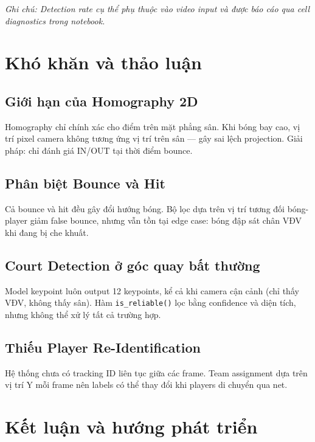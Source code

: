 \documentclass[12pt,a4paper]{article}
\begin{document}
\textit{Ghi chú: Detection rate cụ thể phụ thuộc vào video input và được báo cáo qua cell diagnostics trong notebook.}

\section{Khó khăn và thảo luận}
\label{sec:challenges}

\subsection{Giới hạn của Homography 2D}
Homography chỉ chính xác cho điểm trên mặt phẳng sân. Khi bóng bay cao, vị trí pixel camera không tương ứng vị trí trên sân --- gây sai lệch projection. Giải pháp: chỉ đánh giá IN/OUT tại thời điểm bounce.

\subsection{Phân biệt Bounce và Hit}
Cả bounce và hit đều gây đổi hướng bóng. Bộ lọc dựa trên vị trí tương đối bóng-player giảm false bounce, nhưng vẫn tồn tại edge case: bóng đập sát chân VĐV khi đang bị che khuất.

\subsection{Court Detection ở góc quay bất thường}
Model keypoint luôn output 12 keypoints, kể cả khi camera cận cảnh (chỉ thấy VĐV, không thấy sân). Hàm \texttt{is\_reliable()} lọc bằng confidence và diện tích, nhưng không thể xử lý tất cả trường hợp.

\subsection{Thiếu Player Re-Identification}
Hệ thống chưa có tracking ID liên tục giữa các frame. Team assignment dựa trên vị trí Y mỗi frame nên labels có thể thay đổi khi players di chuyển qua net.

\section{Kết luận và hướng phát triển}
\label{sec:conclusion}
\end{document}

